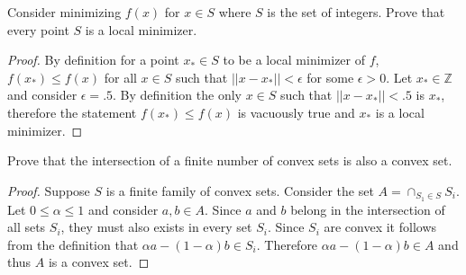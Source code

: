 \documentclass[12pt]{article}
\makeatletter
\theoremstyle{homework}
\newenvironment{exercise}[1]
{\def\@currentlabel{#1}\exercisecore}
{\endexercisecore}
\makeatother
\begin{document}
\begin{exercise}{2.7} Consider minimizing $f(x)$ for $x \in S$ where $S$ is the set of integers. 
  Prove that every point $S$ is a local minimizer. \\
  \begin{proof}
    By definition for a point $x_* \in S$ to be a local minimizer of $f$, $f(x_*) \leq f(x)$ for all $x \in S$ such that $||x - x_*|| < \epsilon$ for some $\epsilon > 0$.
    Let $x_* \in \mathbb{Z}$ and consider $\epsilon = .5$. By definition the only $x \in S$ such that  $||x - x_*|| < .5$ is $x_*$, therefore the statement $f(x_*) \leq f(x)$ is vacuously true 
    and $x_*$ is a local minimizer. 

  \end{proof}
\end{exercise}
\vspace{.5in}

\begin{exercise}{3.1} Prove that the intersection of a finite number of convex sets is also a convex set.\\
  \begin{proof} Suppose $S$ is a finite family of convex sets. Consider the set $A = \cap_{S_1 \in S} S_i$. Let $0 \leq \alpha \leq 1$ and consider
    $a, b \in A$. Since $a$ and $b$ belong in the intersection of all sets $S_i$, they must also exists in every set $S_i$. Since $S_i$ are convex it follows from the definition 
    that $\alpha a - (1 - \alpha)b \in S_i$. Therefore $\alpha a - (1 - \alpha)b \in A$ and thus $A$ is a convex set. 
  \end{proof}
\end{exercise}
\vspace{.5in}
\end{document}
